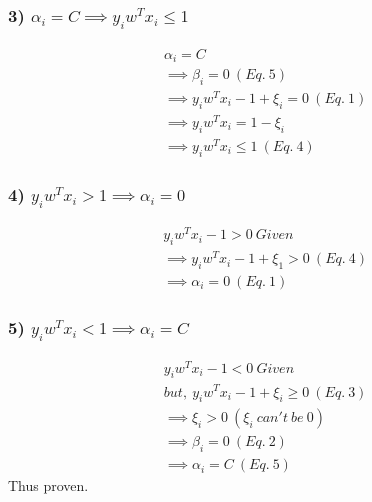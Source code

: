 \documentclass{article}
\begin{document}
\subsubsection*{3) $\alpha_i = C\implies y_i w^T x_i \leq 1$}
\begin{align*}
    &\alpha_i = C\\
    &\implies \beta_i = 0\ (Eq.\ 5)\\
    &\implies  y_i w^T x_i - 1 + \xi_i = 0\ (Eq.\ 1)\\
    &\implies  y_i w^T x_i = 1 - \xi_i\\
    &\implies  y_i w^T x_i \leq 1 \ (Eq.\ 4)
\end{align*}
\subsubsection*{4) $y_i w^T x_i > 1 \implies \alpha_i = 0$}
\begin{align*}
    &y_i w^T x_i - 1>0\ Given\\
    &\implies y_i w^T x_i - 1 + \xi_1>0\ (Eq.\ 4)\\
    &\implies  \alpha_i = 0\ (Eq.\ 1)
\end{align*}
\subsubsection*{5) $y_i w^T x_i < 1 \implies \alpha_i = C$}
\begin{align*}
    &y_i w^T x_i - 1<0\ Given\\
    &but,\ y_i w^T x_i - 1 + \xi_i \geq 0\ (Eq.\ 3)\\
    &\implies \xi_i > 0\ (\xi_i\ can't\ be\ 0)\\
    &\implies \beta_i = 0\ (Eq.\ 2)\\
    &\implies \alpha_i = C\ (Eq.\ 5)
\end{align*}
Thus proven.
\end{document}
